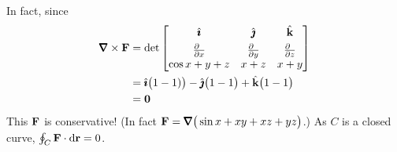 \begin{eg}
In fact, since
\begin{align*}
\vnabla\times\vF
&=\det\left[\begin{matrix}\hi&\hj&\hk \\[0.05in]
           \frac{\partial\hfill}{\partial x}
                 &\frac{\partial\hfill}{\partial y}
                 &\frac{\partial\hfill}{\partial z}\\
                \cos x +  y+z&x+z&x+y\end{matrix}\right] \\
&=\hi\big(1-1)\big)-\hj\big(1-1\big)+\hk\big(1-1\big) \\
&=\vZero 
\end{align*}
This $\mathbf{F}$ is conservative! (In fact 
$\vF=\vnabla\big(\sin x + xy + xz +yz\big)$.) As $C$ is a closed
curve,  $
\oint_C\mathbf{F}\cdot\mathrm{d}\mathbf{r}=0
$.
\end{eg}

